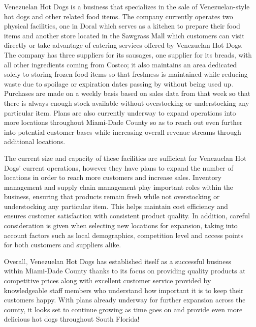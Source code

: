 

Venezuelan Hot Dogs is a business that specializes in the sale of Venezuelan-style hot dogs and other related food items. The company currently operates two physical facilities, one in Doral which serves as a kitchen to prepare their food items and another store located in the Sawgrass Mall which customers can visit directly or take advantage of catering services offered by Venezuelan Hot Dogs. The company has three suppliers for its sausages, one supplier for its breads, with all other ingredients coming from Costco; it also maintains an area dedicated solely to storing frozen food items so that freshness is maintained while reducing waste due to spoilage or expiration dates passing by without being used up. Purchases are made on a weekly basis based on sales data from that week so that there is always enough stock available without overstocking or understocking any particular item. Plans are also currently underway to expand operations into more locations throughout Miami-Dade County so as to reach out even further into potential customer bases while increasing overall revenue streams through additional locations. 

The current size and capacity of these facilities are sufficient for Venezuelan Hot Dogs' current operations, however they have plans to expand the number of locations in order to reach more customers and increase sales. Inventory management and supply chain management play important roles within the business, ensuring that products remain fresh while not overstocking or understocking any particular item. This helps maintain cost efficiency and ensures customer satisfaction with consistent product quality. In addition, careful consideration is given when selecting new locations for expansion, taking into account factors such as local demographics, competition level and access points for both customers and suppliers alike. 

Overall, Venezuelan Hot Dogs has established itself as a successful business within Miami-Dade County thanks to its focus on providing quality products at competitive prices along with excellent customer service provided by knowledgeable staff members who understand how important it is to keep their customers happy. With plans already underway for further expansion across the county, it looks set to continue growing as time goes on and provide even more delicious hot dogs throughout South Florida!